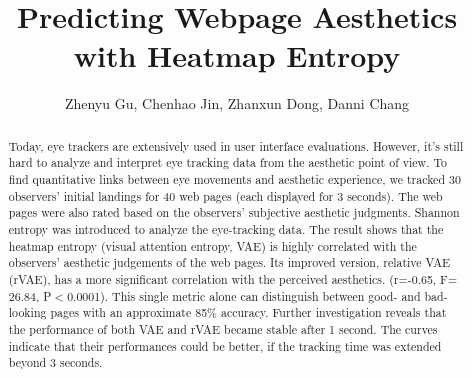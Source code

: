 \documentclass[final,authoryear,3p,times]{elsarticle}
\begin{document}
    
    \begin{frontmatter}
    
    
    
    \title{Predicting Webpage Aesthetics with Heatmap Entropy}
    
    \author{
       Zhenyu Gu,
       Chenhao Jin,
       Zhanxun Dong,
       Danni Chang
    }
    \address{Interaction Design Lab, School of Media and Design, Shanghai Jiao Tong University, China}
    
    
    \begin{abstract}
    Today, eye trackers are extensively used in user interface evaluations. However, it's still hard to analyze and interpret eye tracking data from the aesthetic point of view. To find quantitative links between eye movements and aesthetic experience, we tracked 30 observers' initial landings for 40 web pages (each displayed for 3 seconds). The web pages were also rated based on the observers' subjective aesthetic judgments.
    Shannon entropy was introduced to analyze the eye-tracking data. The result shows that the heatmap entropy (visual attention entropy, VAE) is highly correlated with the observers' aesthetic judgements of the web pages. Its improved version, relative VAE (rVAE), has a more significant correlation with the perceived aesthetics. (r=-0.65, F= 26.84, P$<$0.0001). This single metric alone can distinguish between good- and bad-looking pages with an approximate 85\% accuracy. Further investigation reveals that the performance of both VAE and rVAE became stable after 1 second. The curves indicate that their performances could be better, if the tracking time was extended beyond 3 seconds.
    \end{abstract}
    

\end{frontmatter}
\end{document}
